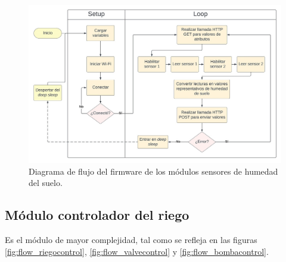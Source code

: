 \begin{figure}[!h]
	\centering
	\includegraphics[width=1\textwidth]{./Figures/chapter3/FirmwareSoilSensor.jpg}
	\caption[Diagrama de flujo del firmware de los módulos sensores de humedad del suelo]{Diagrama de flujo del firmware de los módulos sensores de humedad del suelo.}
	\label{fig:flow_soilsensor}
\end{figure}



\subsection{Módulo controlador del riego}
\label{Módulo controlador del riego}

Es el módulo de mayor complejidad, tal como se refleja en las figuras \ref{fig:flow_riegocontrol}, \ref{fig:flow_valvecontrol}  y \ref{fig:flow_bombacontrol}.

